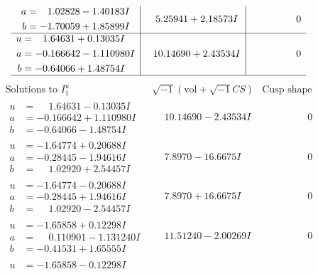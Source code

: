 \documentclass[1p]{elsarticle_modified}
\theoremstyle{definition}
\newcommand{\I}{\sqrt{-1}}
\begin{document}
$$\begin{array}{c|c|c}
\begin{aligned}
a &= \phantom{-}1.02828 - 1.40183 I \\
b &= -1.70059 + 1.85899 I\end{aligned}
 & \phantom{-}5.25941 + 2.18573 I & \phantom{-0.000000 } 0 \\ \hline\begin{aligned}
u &= \phantom{-}1.64631 + 0.13035 I \\
a &= -0.166642 - 1.110980 I \\
b &= -0.64066 + 1.48754 I\end{aligned}
 & \phantom{-}10.14690 + 2.43534 I & \phantom{-0.000000 } 0\\
 \hline 
 \end{array}$$\newpage$$\begin{array}{c|c|c}  
\text{Solutions to }I^u_{1}& \I (\text{vol} + \sqrt{-1}CS) & \text{Cusp shape}\\
 \hline 
\begin{aligned}
u &= \phantom{-}1.64631 - 0.13035 I \\
a &= -0.166642 + 1.110980 I \\
b &= -0.64066 - 1.48754 I\end{aligned}
 & \phantom{-}10.14690 - 2.43534 I & \phantom{-0.000000 } 0 \\ \hline\begin{aligned}
u &= -1.64774 + 0.20688 I \\
a &= -0.28445 - 1.94616 I \\
b &= \phantom{-}1.02920 + 2.54457 I\end{aligned}
 & \phantom{-}7.8970 - 16.6675 I & \phantom{-0.000000 } 0 \\ \hline\begin{aligned}
u &= -1.64774 - 0.20688 I \\
a &= -0.28445 + 1.94616 I \\
b &= \phantom{-}1.02920 - 2.54457 I\end{aligned}
 & \phantom{-}7.8970 + 16.6675 I & \phantom{-0.000000 } 0 \\ \hline\begin{aligned}
u &= -1.65858 + 0.12298 I \\
a &= \phantom{-}0.110901 - 1.131240 I \\
b &= -0.41531 + 1.65555 I\end{aligned}
 & \phantom{-}11.51240 - 2.00269 I & \phantom{-0.000000 } 0 \\ \hline\begin{aligned}
u &= -1.65858 - 0.12298 I \\

\end{aligned}
\end{array}$$
\end{document}
